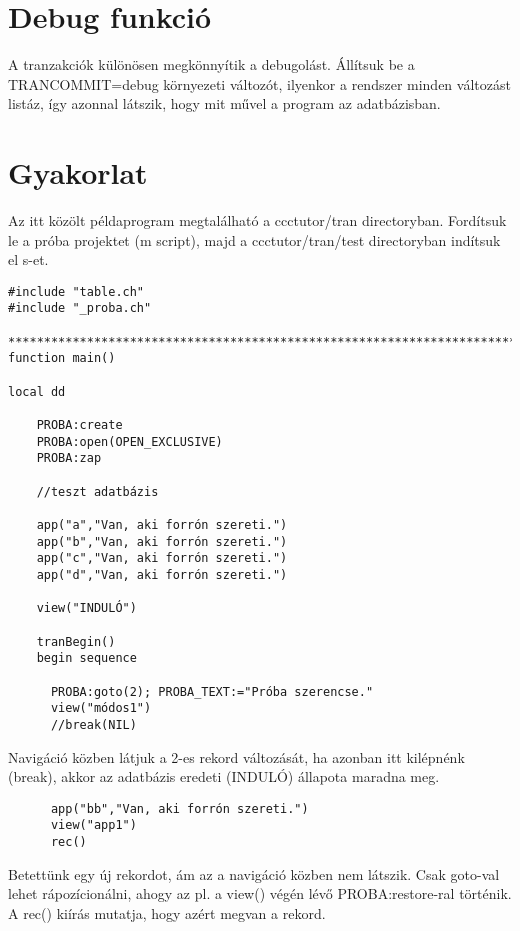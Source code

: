 \section{Debug funkció} 

A tranzakciók különösen megkönnyítik a debugolást.
Állítsuk be a TRANCOMMIT=debug környezeti változót,
ilyenkor a rendszer minden változást listáz, így azonnal látszik,
hogy mit művel a program az adatbázisban.
 



\section{Gyakorlat}

Az itt közölt példaprogram megtalálható a ccctutor/tran directoryban.
Fordítsuk le a próba projektet (m script), majd a ccctutor/tran/test
directoryban indítsuk el s-et.

\begin{verbatim}
#include "table.ch"
#include "_proba.ch"

*****************************************************************************
function main()

local dd

    PROBA:create
    PROBA:open(OPEN_EXCLUSIVE)
    PROBA:zap
    
    //teszt adatbázis

    app("a","Van, aki forrón szereti.")
    app("b","Van, aki forrón szereti.")
    app("c","Van, aki forrón szereti.")
    app("d","Van, aki forrón szereti.")
    
    view("INDULÓ")
 
    tranBegin()
    begin sequence

      PROBA:goto(2); PROBA_TEXT:="Próba szerencse." 
      view("módos1")
      //break(NIL) 
\end{verbatim}

      Navigáció közben látjuk a 2-es rekord változását,
      ha azonban itt kilépnénk (break), akkor az adatbázis 
      eredeti (INDULÓ) állapota maradna meg.

\begin{verbatim}
      app("bb","Van, aki forrón szereti.")
      view("app1")
      rec()
\end{verbatim}

      Betettünk egy új rekordot, ám az a navigáció közben 
      nem látszik. Csak goto-val lehet rápozícionálni, ahogy
      az pl. a view() végén lévő PROBA:restore-ral történik.
      A rec() kiírás mutatja, hogy azért megvan a rekord.

